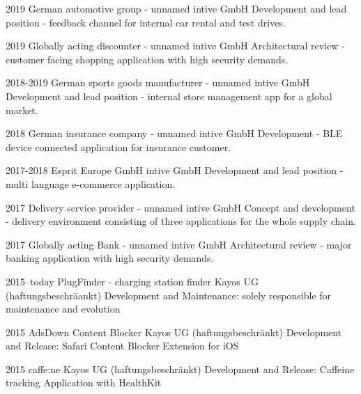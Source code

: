 \documentclass[]{friggeri-cv} %
\begin{document}
\begin{entrylist}

	
	\entry
	{2019}
	{German automotive group - unnamed}
	{intive GmbH}
	{Development and lead position - feedback channel for internal car rental and test drives.}
	
	
	\entry
	{2019}
	{Globally acting discounter - unnamed}
	{intive GmbH}
	{Architectural review - customer facing shopping application with high security demands.}
	
	
	\entry
	{2018-2019}
	{German sports goods manufacturer - unnamed}
	{intive GmbH}
	{Development and lead position - internal store management app for a global market.}
	
	
	\entry
	{2018}
	{German insurance company - unnamed}
	{intive GmbH}
	{Development - BLE device connected application for insurance customer.}
	
	
	\entry
	{2017-2018}
	{Esprit Europe GmbH}
	{intive GmbH}
	{Development and lead position - multi language e-commerce application.}
	
		
	\entry
	{2017}
	{Delivery service provider - unnamed}
	{intive GmbH}
	{Concept and development - delivery environment consisting of three applications for the whole supply chain.}
	
	
	\entry
	{2017}
	{Globally acting Bank - unnamed}
	{intive GmbH}
	{Architectural review - major banking application with high security demands.}
		
	
	\entry
	{2015--today}
	{PlugFinder - charging station finder}
	{Kayos UG (haftungsbeschr\"{a}ankt)}
	{Development and Maintenance: solely responsible for maintenance and evolution}
	
	
	\entry
	{2015}
	{AdsDown Content Blocker}
	{Kayos UG (haftungsbeschr\"{a}nkt)}
	{Development and Release: Safari Content Blocker Extension for iOS}
	
	
	\entry
	{2015}
	{caffe:ne}
	{Kayos UG (haftungsbeschr\"{a}nkt)}
	{Development and Release: Caffeine tracking Application with HealthKit}
	

\end{entrylist}
\end{document}
